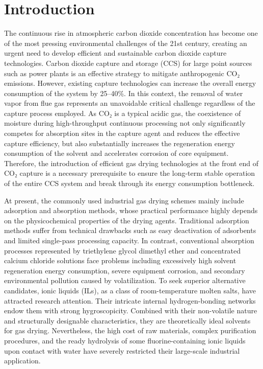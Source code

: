 \documentclass[AMA,LATO2COL]{WileyNJDv5} %
\begin{document}


\maketitle

\section{Introduction}

The continuous rise in atmospheric carbon dioxide concentration has become one of the most pressing environmental challenges of the 21st century, creating an urgent need to develop efficient and sustainable carbon dioxide capture technologies. Carbon dioxide capture and storage (CCS) for large point sources such as power plants is an effective strategy to mitigate anthropogenic CO₂ emissions. However, existing capture technologies can increase the overall energy consumption of the system by 25–40\%. In this context, the removal of water vapor from flue gas represents an unavoidable critical challenge regardless of the capture process employed. As CO₂ is a typical acidic gas, the coexistence of moisture during high-throughput continuous processing not only significantly competes for absorption sites in the capture agent and reduces the effective capture efficiency, but also substantially increases the regeneration energy consumption of the solvent and accelerates corrosion of core equipment. Therefore, the introduction of efficient gas drying technologies at the front end of CO₂ capture is a necessary prerequisite to ensure the long-term stable operation of the entire CCS system and break through its energy consumption bottleneck.

At present, the commonly used industrial gas drying schemes mainly include adsorption and absorption methods, whose practical performance highly depends on the physicochemical properties of the drying agents. Traditional adsorption methods suffer from technical drawbacks such as easy deactivation of adsorbents and limited single-pass processing capacity. In contrast, conventional absorption processes represented by triethylene glycol dimethyl ether and concentrated calcium chloride solutions face problems including excessively high solvent regeneration energy consumption, severe equipment corrosion, and secondary environmental pollution caused by volatilization. To seek superior alternative candidates, ionic liquids (ILs), as a class of room-temperature molten salts, have attracted research attention. Their intricate internal hydrogen-bonding networks endow them with strong hygroscopicity. Combined with their non-volatile nature and structurally designable characteristics, they are theoretically ideal solvents for gas drying. Nevertheless, the high cost of raw materials, complex purification procedures, and the ready hydrolysis of some fluorine-containing ionic liquids upon contact with water have severely restricted their large-scale industrial application.
\end{document}
